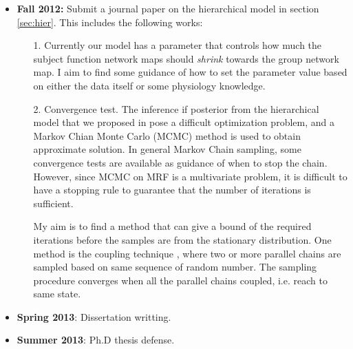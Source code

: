 \documentclass[12pt]{article}
\begin{document}
\begin{itemize}
  \item \textbf{Fall 2012:} Submit a journal paper on the hierarchical model in section \ref{sec:hier}. This includes the following works:
    \begin{itemize}
      \item [1.] Currently our model has a parameter that controls how much the
        subject function network maps should \emph{shrink} towards the group
        network map. I aim to find some guidance of how to set the parameter
        value based on either the data itself or some physiology knowledge.
        
      \item [2.] Convergence test. The inference if posterior from the
        hierarchical model that we proposed in \cite{Liu2012a} pose a difficult
        optimization problem, and a Markov Chian Monte Carlo (MCMC) method is
        used to obtain approximate solution. In general Markov Chain sampling,
        some convergence tests are available \cite{cowles1996markov} as guidance
        of when to stop the chain. However, since MCMC on MRF is a multivariate
        problem, it is difficult to have a stopping rule to guarantee that the
        number of iterations is sufficient. 

        My aim is to find a method that can give a bound of the required
        iterations before the samples are from the stationary distribution. One
        method is the coupling technique
        \cite{haggstrom1999exact,propp1996exact}, where two or more parallel
        chains are sampled based on same sequence of random number. The sampling
        procedure converges when all the parallel chains coupled, i.e. reach to
        same state.


    \end{itemize}
  \item \textbf{Spring 2013}: Dissertation writting.
  \item \textbf{Summer 2013}: Ph.D thesis defense.
\end{itemize}




\end{document}
